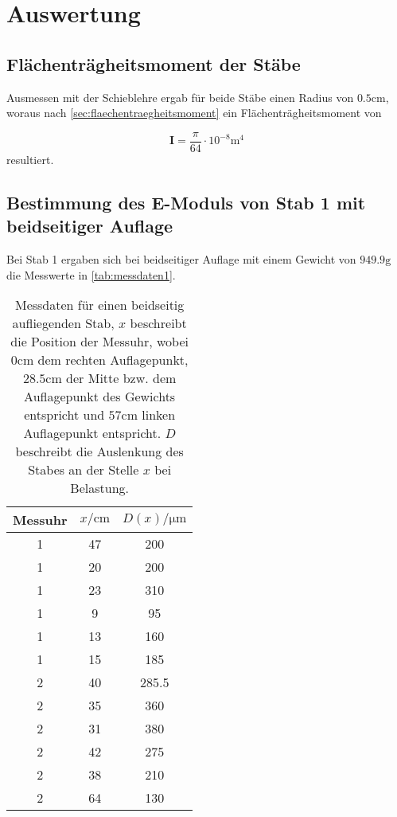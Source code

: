 \section{Auswertung}
\label{sec:Auswertung}
\subsection{Flächenträgheitsmoment der Stäbe}
Ausmessen mit der Schieblehre ergab für beide Stäbe einen Radius von 
$0.5\si{\centi\meter}$, woraus nach \autoref{sec:flaechentraegheitsmoment} ein
Flächenträgheitsmoment von

\begin{equation}
	\mathbf{I} 
	= \frac{\pi}{64} \cdot 10^{-8} \si{\m^4}
	\label{eqn:IWert}
\end{equation}
resultiert.

\subsection{Bestimmung des E-Moduls von Stab 1 mit beidseitiger Auflage}
\label{sec:messung1}
Bei Stab 1 ergaben sich bei beidseitiger Auflage mit einem Gewicht von $949.9 \si{\gram}$ 
die Messwerte in \autoref{tab:messdaten1}.

\begin{table}
	\centering
	\caption{Messdaten für einen beidseitig aufliegenden Stab, $x$ beschreibt
	die Position der Messuhr, wobei $0\si{\centi\meter}$
	dem rechten Auflagepunkt, $28.5\si{\centi\meter}$ der Mitte bzw. dem Auflagepunkt 
	des Gewichts entspricht und $57\si{\centi\meter}$ linken Auflagepunkt entspricht.
	$D$ beschreibt die Auslenkung des Stabes an der Stelle $x$ bei Belastung.}
	\label{tab:messdaten1}
	\begin{tabular}{c c c}
	\toprule
	Messuhr &
	$x / \si{\centi\meter}$ &
	$D(x) / \si{\micro\meter}$
	\\
	\midrule
	1 & 47 & 200 \\
	1 & 20 & 200 \\
	1 & 23 & 310 \\
	1 & 9 & 95 \\
	1 & 13 & 160 \\
	1 & 15 & 185 \\
	2 & 40 & 285.5 \\
	2 & 35 & 360 \\
	2 & 31 & 380 \\
	2 & 42 & 275 \\
	2 & 38 & 210 \\
	2 & 64 & 130 \\
	\bottomrule
\end{tabular}
\end{table}

